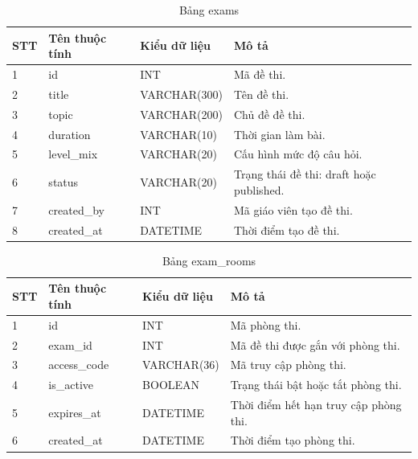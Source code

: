 \documentclass[12pt,a4paper]{article}
\begin{document}
	\begin{table}[H]
		\centering
		\caption{Bảng exams}
		\label{tab:exams}
		\begin{tabular}{|p{1.5cm}|p{4cm}|p{4cm}|p{5.5cm}|}
			\hline
			\centering\textbf{STT} & \centering\textbf{Tên thuộc tính} & \centering\textbf{Kiểu dữ liệu} & \centering\arraybackslash\textbf{Mô tả} \\
			\hline
			1 & id & INT & Mã đề thi. \\
			\hline
			2 & title & VARCHAR(300) & Tên đề thi. \\
			\hline
			3 & topic & VARCHAR(200) & Chủ đề đề thi. \\
			\hline
			4 & duration & VARCHAR(10) & Thời gian làm bài. \\
			\hline
			5 & level\_mix & VARCHAR(20) & Cấu hình mức độ câu hỏi. \\
			\hline
			6 & status & VARCHAR(20) & Trạng thái đề thi: draft hoặc published. \\
			\hline
			7 & created\_by & INT & Mã giáo viên tạo đề thi. \\
			\hline
			8 & created\_at & DATETIME & Thời điểm tạo đề thi. \\
			\hline
		\end{tabular}
	\end{table}
	
	\begin{table}[H]
		\centering
		\caption{Bảng exam\_rooms}
		\label{tab:exam_rooms}
		\begin{tabular}{|p{1.5cm}|p{4cm}|p{4cm}|p{5.5cm}|}
			\hline
			\centering\textbf{STT} & \centering\textbf{Tên thuộc tính} & \centering\textbf{Kiểu dữ liệu} & \centering\arraybackslash\textbf{Mô tả} \\
			\hline
			1 & id & INT & Mã phòng thi. \\
			\hline
			2 & exam\_id & INT & Mã đề thi được gắn với phòng thi. \\
			\hline
			3 & access\_code & VARCHAR(36) & Mã truy cập phòng thi. \\
			\hline
			4 & is\_active & BOOLEAN & Trạng thái bật hoặc tắt phòng thi. \\
			\hline
			5 & expires\_at & DATETIME & Thời điểm hết hạn truy cập phòng thi. \\
			\hline
			6 & created\_at & DATETIME & Thời điểm tạo phòng thi. \\
			\hline
		\end{tabular}
	\end{table}
	
\end{document}
